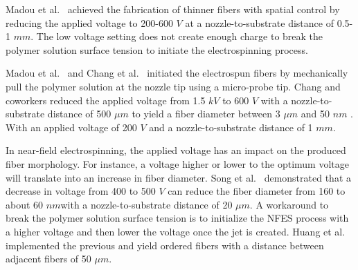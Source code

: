 \documentclass[5p,,preprint,12pt,twocolumn]{elsarticle}
\begin{document}
Madou et al.\unskip~\cite{527120:11973130} achieved the fabrication of thinner fibers with spatial control by reducing the applied voltage to 200-600 $V $  at a nozzle-to-substrate distance of 0.5-1 $mm $. The low voltage setting does not create enough charge to break the polymer solution surface tension to initiate the electrospinning process.

Madou et al.\unskip~\cite{527120:11973130} and Chang et al.\unskip~\cite{527120:11974306} initiated the electrospun fibers by mechanically pull the polymer solution at the nozzle tip using a micro-probe tip. Chang and coworkers reduced the applied voltage from 1.5 $kV $ to 600 $V $ with a nozzle-to-substrate distance of 500 $\mu m $ to yield a fiber diameter between 3 $\mu m $  and 50 $nm $ . With an applied voltage of 200 $V $ and a nozzle-to-substrate distance of 1 $mm $.

In near-field electrospinning, the applied voltage has an impact on the produced fiber morphology. For instance, a voltage higher or lower to the optimum voltage will translate into an increase in fiber diameter. Song et al.\unskip~\cite{527120:11974320} demonstrated that a decrease in voltage from 400 to 500 $V $ can reduce the fiber diameter from 160 to about 60 $nm $with a nozzle-to-substrate distance of 20 $\mu m $. A workaround to break the polymer solution surface tension is to initialize the NFES process with a higher voltage and then lower the voltage once the jet is created. Huang et al.\unskip~\cite{527120:11974311} implemented the previous and yield ordered fibers with a distance between adjacent fibers of 50 $\mu m $.
\end{document}

